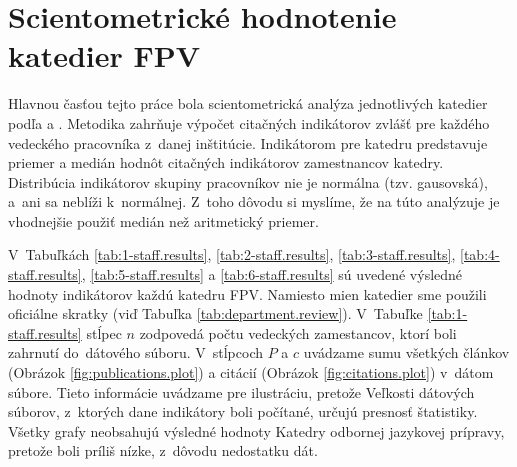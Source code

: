 \section{Scientometrické hodnotenie katedier FPV}

Hlavnou časťou tejto práce bola scientometrická analýza jednotlivých katedier
podľa \citet{Kazakis2014a} a \citet{Kazakis2014b,Kazakis2015}. Metodika zahrňuje
výpočet citačných indikátorov zvlášť pre každého vedeckého pracovníka
z~danej inštitúcie. Indikátorom pre katedru predstavuje priemer a medián
hodnôt citačných indikátorov zamestnancov katedry.
Distribúcia indikátorov skupiny pracovníkov nie je normálna (tzv. gausovská),
a~ani sa neblíži k~normálnej. Z~toho dôvodu si myslíme, že na túto analýzuje je
vhodnejšie použiť medián než aritmetický priemer.

V~Tabuľkách  \ref{tab:1-staff.results}, \ref{tab:2-staff.results},
\ref{tab:3-staff.results}, \ref{tab:4-staff.results}, \ref{tab:5-staff.results}
a \ref{tab:6-staff.results} sú uvedené výsledné hodnoty indikátorov každú
katedru FPV.  Namiesto mien katedier sme použili oficiálne skratky (viď Tabuľka
\ref{tab:department.review}).  V~Tabuľke  \ref{tab:1-staff.results} stĺpec $n$
zodpovedá počtu vedeckých zamestancov, ktorí boli zahrnutí do~dátového súboru.
V~stĺpcoch $P$ a $c$ uvádzame sumu všetkých článkov (Obrázok
\ref{fig:publications.plot}) a citácií (Obrázok \ref{fig:citations.plot})
v~dátom súbore.  Tieto informácie uvádzame pre ilustráciu, pretože Veľkosti
dátových súborov, z~ktorých dane indikátory boli počítané, určujú presnosť
štatistiky. Všetky grafy neobsahujú výsledné hodnoty Katedry odbornej
jazykovej prípravy, pretože boli príliš nízke, z~dôvodu nedostatku dát.



